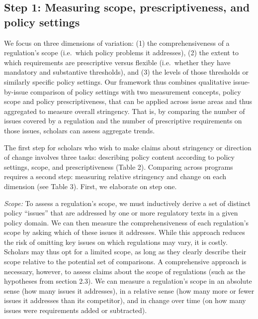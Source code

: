 \documentclass[
      12pt,
            Review ]{article}
\begin{document}
\subsection{Step 1: Measuring scope, prescriptiveness, and policy
settings}\label{step-1-measuring-scope-prescriptiveness-and-policy-settings}

We focus on three dimensions of variation: (1) the comprehensiveness of
a regulation's scope (i.e.~which policy problems it addresses), (2) the
extent to which requirements are prescriptive versus flexible
(i.e.~whether they have mandatory and substantive thresholds), and (3)
the levels of those thresholds or similarly specific policy settings.
Our framework thus combines qualitative issue-by-issue comparison of
policy settings with two measurement concepts, policy scope and policy
prescriptiveness, that can be applied across issue areas and thus
aggregated to measure overall stringency. That is, by comparing the
number of issues covered by a regulation and the number of prescriptive
requirements on those issues, scholars can assess aggregate trends.

The first step for scholars who wish to make claims about stringency or
direction of change involves three tasks: describing policy content
according to policy settings, scope, and prescriptiveness (Table 2).
Comparing across programs requires a second step: measuring relative
stringency and change on each dimension (see Table 3). First, we
elaborate on step one.



\emph{Scope:} To assess a regulation's scope, we must inductively derive
a set of distinct policy ``issues'' that are addressed by one or more
regulatory texts in a given policy domain. We can then measure the
comprehensiveness of each regulation's scope by asking which of these
issues it addresses. While this approach reduces the risk of omitting
key issues on which regulations may vary, it is costly. Scholars may
thus opt for a limited scope, as long as they clearly describe their
scope relative to the potential set of comparisons. A comprehensive
approach is necessary, however, to assess claims about the scope of
regulations (such as the hypotheses from section 2.3). We can measure a
regulation's scope in an absolute sense (how many issues it addresses),
in a relative sense (how many more or fewer issues it addresses than its
competitor), and in change over time (on how many issues were
requirements added or subtracted).
\end{document}
